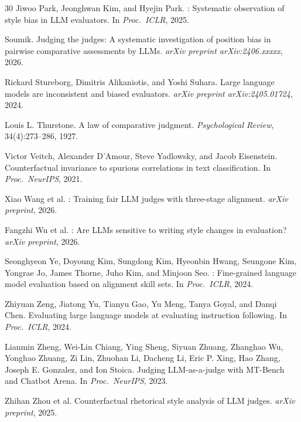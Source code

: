 \documentclass[11pt]{article}
\begin{document}
\begin{thebibliography}{30}
Jiwoo Park, Jeonghwan Kim, and Hyejin Park.
: Systematic observation of style bias in LLM evaluators.
\newblock In \emph{Proc.\ ICLR}, 2025.

Soumik.
\newblock Judging the judges: A systematic investigation of position bias in pairwise comparative assessments by LLMs.
\newblock \emph{arXiv preprint arXiv:2406.xxxxx}, 2026.

Rickard Stureborg, Dimitris Alikaniotis, and Yoshi Suhara.
\newblock Large language models are inconsistent and biased evaluators.
\newblock \emph{arXiv preprint arXiv:2405.01724}, 2024.

Louis L. Thurstone.
\newblock A law of comparative judgment.
\newblock \emph{Psychological Review}, 34(4):273--286, 1927.

Victor Veitch, Alexander D'Amour, Steve Yadlowsky, and Jacob Eisenstein.
\newblock Counterfactual invariance to spurious correlations in text classification.
\newblock In \emph{Proc.\ NeurIPS}, 2021.

Xiao Wang et al.
: Training fair LLM judges with three-stage alignment.
\newblock \emph{arXiv preprint}, 2026.

Fangzhi Wu et al.
: Are LLMs sensitive to writing style changes in evaluation?
\newblock \emph{arXiv preprint}, 2026.

Seonghyeon Ye, Doyoung Kim, Sungdong Kim, Hyeonbin Hwang, Seungone Kim, Yongrae Jo, James Thorne, Juho Kim, and Minjoon Seo.
: Fine-grained language model evaluation based on alignment skill sets.
\newblock In \emph{Proc.\ ICLR}, 2024.

Zhiyuan Zeng, Jiatong Yu, Tianyu Gao, Yu Meng, Tanya Goyal, and Danqi Chen.
\newblock Evaluating large language models at evaluating instruction following.
\newblock In \emph{Proc.\ ICLR}, 2024.

Lianmin Zheng, Wei-Lin Chiang, Ying Sheng, Siyuan Zhuang, Zhanghao Wu, Yonghao Zhuang, Zi Lin, Zhuohan Li, Dacheng Li, Eric P. Xing, Hao Zhang, Joseph E. Gonzalez, and Ion Stoica.
\newblock Judging {LLM}-as-a-judge with {MT-Bench} and {Chatbot Arena}.
\newblock In \emph{Proc.\ NeurIPS}, 2023.

Zhihan Zhou et al.
\newblock Counterfactual rhetorical style analysis of LLM judges.
\newblock \emph{arXiv preprint}, 2025.

\end{thebibliography}
\end{document}
